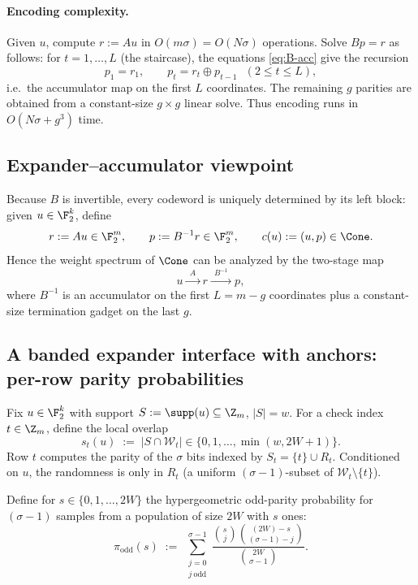 \paragraph{Encoding complexity.}
Given $u$, compute $r:=Au$ in $O(m\sigma)=O(N\sigma)$ operations.
Solve $Bp=r$ as follows:
for $t=1,\dots,L$ (the staircase), the equations \eqref{eq:B-acc} give the recursion
\begin{equation}
p_1=r_1,\qquad p_t = r_t \oplus p_{t-1}\ \ \ (2\le t\le L),
\label{eq:acc-recur}
\end{equation}
i.e.\ the accumulator map on the first $L$ coordinates.
The remaining $g$ parities are obtained from a constant-size $g\times g$ linear solve.
Thus encoding runs in $O(N\sigma + g^3)$ time.

\subsection{Expander--accumulator viewpoint}
\label{subsec:outer-ea-view}

Because $B$ is invertible, every codeword is uniquely determined by its left block:
given $u\in\F_2^k$, define
\[
r:=Au\in\F_2^m,
\qquad
p:=B^{-1}r\in\F_2^m,
\qquad
c(u):=(u,p)\in\Cone.
\]
Hence the weight spectrum of $\Cone$ can be analyzed by the two-stage map
\[
u \xrightarrow{\ \ A\ \ } r \xrightarrow{\ \ B^{-1}\ \ } p,
\]
where $B^{-1}$ is an accumulator on the first $L=m-g$ coordinates plus a constant-size termination gadget on the last $g$.

\subsection{A banded expander interface with anchors: per-row parity probabilities}
\label{subsec:outer-ea-expander-interface}

Fix $u\in\F_2^k$ with support $S:=\supp(u)\subseteq\Z_m$, $|S|=w$.
For a check index $t\in\Z_m$, define the local overlap
\[
s_t(u)\;:=\; |S\cap \mathcal W_t| \in \{0,1,\dots,\min(w,2W+1)\}.
\]
Row $t$ computes the parity of the $\sigma$ bits indexed by $S_t=\{t\}\cup R_t$.
Conditioned on $u$, the randomness is only in $R_t$ (a uniform $(\sigma-1)$-subset of $\mathcal W_t\setminus\{t\}$).

Define for $s\in\{0,1,\dots,2W\}$ the hypergeometric odd-parity probability for $(\sigma-1)$ samples from a population of
size $2W$ with $s$ ones:
\begin{equation}
\pi_{\mathrm{odd}}(s)
\;:=\;
\sum_{\substack{j=0\\ j\ \mathrm{odd}}}^{\sigma-1}
\frac{\binom{s}{j}\binom{(2W)-s}{(\sigma-1)-j}}{\binom{2W}{\sigma-1}}.
\label{eq:pi-odd-anch}
\end{equation}

